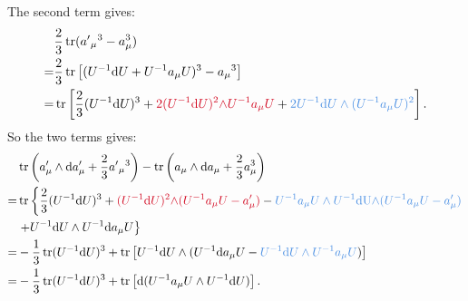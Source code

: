 \documentclass{book}
\begin{document}
The second term gives:
\begin{equation*}
\begin{aligned}
 & \frac{2}{3}\operatorname{tr} (a'{_{\mu }}^{3} -a_{\mu }^{3})\\
= & \frac{2}{3}\operatorname{tr}\left[ (U^{-1}\mathrm{d} U+U^{-1} a_{\mu } U)^{3} -a{_{\mu }}^{3}\right]\\
= & \operatorname{tr}\left[\frac{2}{3} (U^{-1}\mathrm{d} U)^{3} +\textcolor[rgb]{0.82,0.01,0.11}{2(U}\textcolor[rgb]{0.82,0.01,0.11}{^{-1}}\mathrm{\textcolor[rgb]{0.82,0.01,0.11}{d}}\textcolor[rgb]{0.82,0.01,0.11}{U)}\textcolor[rgb]{0.82,0.01,0.11}{^{2}}\textcolor[rgb]{0.82,0.01,0.11}{\land U}\textcolor[rgb]{0.82,0.01,0.11}{^{-1}}\textcolor[rgb]{0.82,0.01,0.11}{a_{\mu } U} +\textcolor[rgb]{0.29,0.56,0.89}{2U}\textcolor[rgb]{0.29,0.56,0.89}{^{-1}}\mathrm{\textcolor[rgb]{0.29,0.56,0.89}{d}}\textcolor[rgb]{0.29,0.56,0.89}{U\land (U}\textcolor[rgb]{0.29,0.56,0.89}{^{-1}}\textcolor[rgb]{0.29,0.56,0.89}{a_{\mu } U)}\textcolor[rgb]{0.29,0.56,0.89}{^{2}}\right] .
\end{aligned}
\end{equation*}
So the two terms gives:
\begin{equation*}
\begin{aligned}
 & \operatorname{tr}\left( a'_{\mu } \land \mathrm{d} a'_{\mu } +\frac{2}{3} a'{_{\mu }}^{3}\right) -\operatorname{tr}\left( a_{\mu } \land \mathrm{d} a_{\mu } +\frac{2}{3} a_{\mu }^{3}\right)\\
= & \operatorname{tr}\left\{\frac{2}{3} (U^{-1}\mathrm{d} U)^{3} +\textcolor[rgb]{0.82,0.01,0.11}{(U}\textcolor[rgb]{0.82,0.01,0.11}{^{-1}}\mathrm{\textcolor[rgb]{0.82,0.01,0.11}{d}}\textcolor[rgb]{0.82,0.01,0.11}{U)}\textcolor[rgb]{0.82,0.01,0.11}{^{2}}\textcolor[rgb]{0.82,0.01,0.11}{\land (U}\textcolor[rgb]{0.82,0.01,0.11}{^{-1}}\textcolor[rgb]{0.82,0.01,0.11}{a_{\mu } U-a'_{\mu } )} -\textcolor[rgb]{0.29,0.56,0.89}{U^{-1}}\textcolor[rgb]{0.29,0.56,0.89}{a_{\mu } U\land U}\textcolor[rgb]{0.29,0.56,0.89}{^{-1}}\mathrm{\textcolor[rgb]{0.29,0.56,0.89}{dU\land }}\textcolor[rgb]{0.29,0.56,0.89}{(U}\textcolor[rgb]{0.29,0.56,0.89}{^{-1}}\textcolor[rgb]{0.29,0.56,0.89}{a_{\mu } U-a'_{\mu } )}\right. \\
 & \left. + U^{-1}\mathrm{d} U\land U^{-1}\mathrm{d} a_{\mu } U\right\}\\
= & -\frac{1}{3}\operatorname{tr} (U^{-1}\mathrm{d} U)^{3} +\operatorname{tr}\left[ U^{-1}\mathrm{d} U\land (U^{-1}\mathrm{d} a_{\mu } U-\textcolor[rgb]{0.29,0.56,0.89}{U^{-1}}\mathrm{\textcolor[rgb]{0.29,0.56,0.89}{d}}\textcolor[rgb]{0.29,0.56,0.89}{U\land U}\textcolor[rgb]{0.29,0.56,0.89}{^{-1}}\textcolor[rgb]{0.29,0.56,0.89}{a_{\mu } U} )\right]\\
= & -\frac{1}{3}\operatorname{tr} (U^{-1}\mathrm{d} U)^{3} +\operatorname{tr}\left[\mathrm{d} (U^{-1} a_{\mu } U\land U^{-1}\mathrm{d} U)\right] .
\end{aligned}
\end{equation*}
\end{document}
